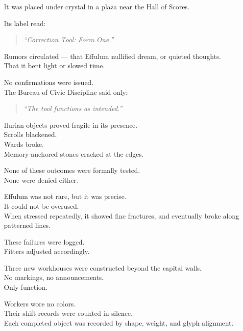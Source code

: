 \documentclass[12pt]{article}
\begin{document}
It was placed under crystal in a plaza near the Hall of Scores.

Its label read:

\begin{quote}
\textit{“Correction Tool: Form One.”}
\end{quote}

\vspace{1em}

Rumors circulated — that Effulum nullified dream, or quieted thoughts.\\
That it bent light or slowed time.

No confirmations were issued.\\
The Bureau of Civic Discipline said only:

\begin{quote}
\textit{“The tool functions as intended.”}
\end{quote}

\vspace{1em}

Ilurian objects proved fragile in its presence.\\
Scrolls blackened.\\
Wards broke.\\
Memory-anchored stones cracked at the edges.

None of these outcomes were formally tested.\\
None were denied either.

\vspace{1em}

Effulum was not rare, but it was precise.\\
It could not be overused.\\
When stressed repeatedly, it showed fine fractures, and eventually broke along patterned lines.

These failures were logged.\\
Fitters adjusted accordingly.

\vspace{1em}

Three new workhouses were constructed beyond the capital walls.\\
No markings, no announcements.\\
Only function.

Workers wore no colors.\\
Their shift records were counted in silence.\\
Each completed object was recorded by shape, weight, and glyph alignment.
\end{document}
